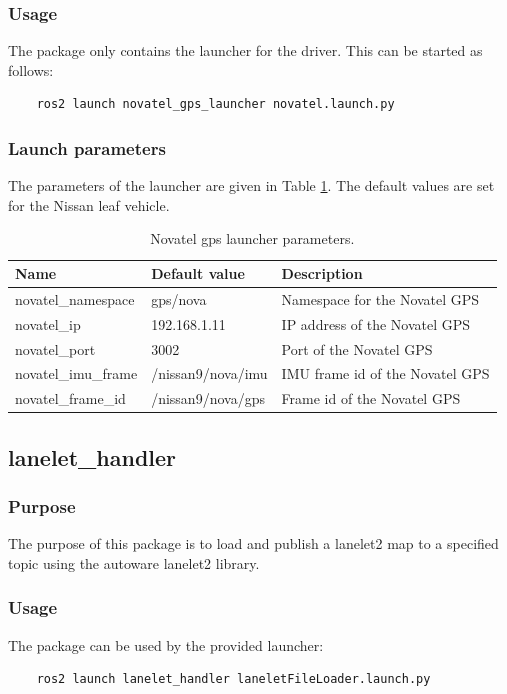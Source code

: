\documentclass[sn-mathphys-num]{sn-jnl}%
\begin{document}
\subsubsection{Usage}
The package only contains the launcher for the driver. This can be started as follows:
\begin{lstlisting}
    ros2 launch novatel_gps_launcher novatel.launch.py
\end{lstlisting}
\subsubsection{Launch parameters}
The parameters of the launcher are given in Table \ref{tab:novatel_gps_launcher}. The default values are set for the Nissan leaf vehicle.
\begin{table}[!h]
    \captionsetup{justification=centering}
    \normalsize
    \caption{\label{tab:novatel_gps_launcher} Novatel gps launcher parameters.}
    \begin{tabular}{| l | l | l |}
        \hline
        \textbf{Name} & \textbf{Default value} & \textbf{Description} \\
        \hline
        novatel\_namespace  & gps/nova          & Namespace for the Novatel GPS \\
        \hline
        novatel\_ip         & 192.168.1.11      & IP address of the Novatel GPS \\
        \hline
        novatel\_port       & 3002              & Port of the Novatel GPS \\
        \hline
        novatel\_imu\_frame & /nissan9/nova/imu & IMU frame id of the Novatel GPS \\
        \hline
        novatel\_frame\_id  & /nissan9/nova/gps & Frame id of the Novatel GPS \\
        \hline
    \end{tabular}
\end{table}


\subsection{lanelet\_handler}
\subsubsection{Purpose}
The purpose of this package is to load and publish a lanelet2 map to a specified topic using the autoware lanelet2 library.
\subsubsection{Usage}
The package can be used by the provided launcher:
\begin{lstlisting}
    ros2 launch lanelet_handler laneletFileLoader.launch.py
\end{lstlisting}
\end{document}
